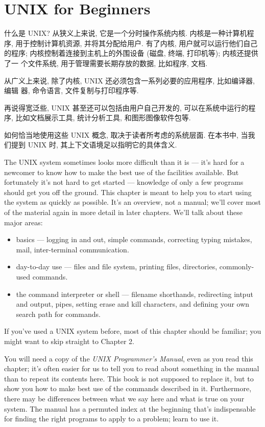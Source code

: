 \chapter{UNIX for Beginners}


什么是 UNIX? 从狭义上来说, 它是一个分时操作系统内核. 内核是一种计算机程序,
用于控制计算机资源, 并将其分配给用户. 有了内核, 用户就可以运行他们自己的程序;
内核控制着连接到主机上的外围设备 (磁盘, 终端, 打印机等); 内核还提供了一
个文件系统, 用于管理需要长期存放的数据, 比如程序, 文档.

从广义上来说, 除了内核, UNIX 还必须包含一系列必要的应用程序, 比如编译器, 编辑
器, 命令语言, 文件复制与打印程序等.

再说得宽泛些, UNIX 甚至还可以包括由用户自己开发的, 可以在系统中运行的程序,
比如文档展示工具, 统计分析工具, 和图形图像软件包等.

如何恰当地使用这些 UNIX 概念, 取决于读者所考虑的系统层面. 在本书中, 当我们提到
UNIX 时, 其上下文语境足以指明它的具体含义.

The UNIX system sometimes looks more difficult than it is --- it's hard for a
newcomer to know how to make the best use of the facilities available. But
fortunately it's not hard to get started --- knowledge of only a few programs
should get you off the ground. This chapter is meant to help you to start using
the system as quickly as possible. It's an overview, not a manual; we'll cover
most of the material again in more detail in later chapters. We'll talk about
these major areas:

\begin{itemize}
\item basics --- logging in and out, simple commands, correcting typing
  mistakes, mail, inter-terminal communication.
\item day-to-day use --- files and file system, printing files, directories,
  commonly-used commands.
\item the command interpreter or shell --- filename shorthands, redirecting
  intput and output, pipes, setting erase and kill characters, and defining your
  own search path for commands.
\end{itemize}
  
If you've used a UNIX system before, most of this chapter should be familiar;
you might want to skip straight to Chapter 2.

You will need a copy of the \textit{UNIX Programmer's Manual}, even as you read
this chapter; it's often easier for us to tell you to read about something in
the manual than to repeat its contents here. This book is not supposed to
replace it, but to show you how to make best use of the commands described in
it. Furthermore, there may be differences between what we say here and what is
true on your system. The manual has a permuted index at the beginning that's
indispensable for finding the right programs to apply to a problem; learn to use
it.

